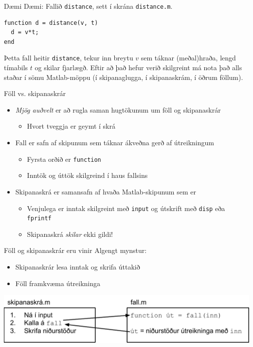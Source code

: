 \documentclass{beamer}
\begin{document}
\begin{frame}[fragile]{Dæmi}
Dæmi: Fallið \texttt{distance}, sett í skrána \texttt{distance.m}.
\begin{verbatim}
function d = distance(v, t)
  d = v*t;
end  
\end{verbatim}
Þetta fall heitir \texttt{distance}, tekur inn breytu $v$ sem táknar (meðal)hraða, lengd tímabils $t$ og skilar fjarlægð. Eftir að það hefur verið skilgreint má nota það alls staðar í sömu Matlab-möppu (í skipanaglugga, í skipanaskrám, í öðrum föllum).
\end{frame}

\begin{frame}{Föll vs. skipanaskrár}
\begin{itemize}
 \item \emph{Mjög auðvelt} er að rugla saman hugtökunum um föll og skipanaskrár
 \begin{itemize}
  \item Hvort tveggja er geymt í skrá
 \end{itemize}
 \item Fall er safn af skipunum sem táknar ákveðna gerð af útreikningum
 \begin{itemize}
  \item Fyrsta orðið er \texttt{function}
  \item Inntök og úttök skilgreind í haus fallsins
 \end{itemize}
 \item Skipanaskrá er samansafn af hvaða Matlab-skipunum sem er
 \begin{itemize}
  \item Venjulega er inntak skilgreint með \texttt{input} og útskrift með \texttt{disp} eða \texttt{fprintf}
  \item Skipanaskrá \emph{skilar} ekki gildi!
 \end{itemize}
\end{itemize}
\end{frame}

\begin{frame}{Föll og skipanaskrár eru vinir}
Algengt mynstur:
\begin{itemize}
 \item Skipanaskrár lesa inntak og skrifa úttakið
 \item Föll framkvæma útreikninga
\end{itemize}

\includegraphics[width=\textwidth]{../Pics/skripta-og-fall}
\end{frame}
\end{document}
